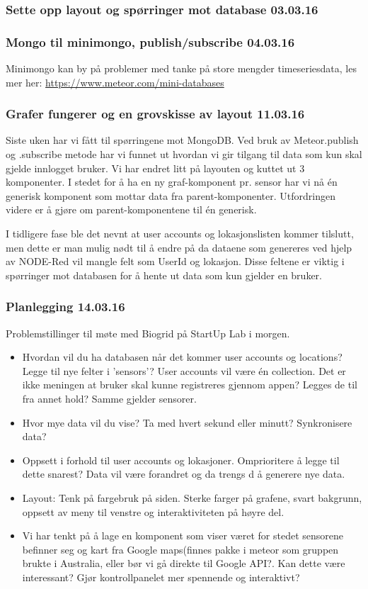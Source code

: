 \documentclass[12pt, oneside]{article}
\begin{document}
\subsubsection{Sette opp layout og spørringer mot database 03.03.16}



\subsubsection{Mongo til minimongo, publish/subscribe 04.03.16}
Minimongo kan by på problemer med tanke på store mengder timeseriesdata, les mer her: \url{https://www.meteor.com/mini-databases}


\subsubsection{Grafer fungerer og en grovskisse av layout 11.03.16}
Siste uken har vi fått til spørringene mot MongoDB. Ved bruk av Meteor.publish og .subscribe metode har vi funnet ut hvordan vi gir tilgang til data som kun skal gjelde innlogget bruker. 
Vi har endret litt på layouten og kuttet ut 3 komponenter. I stedet for å ha en ny graf-komponent pr. sensor har vi nå én generisk komponent som mottar data fra parent-komponenter. Utfordringen videre er å gjøre om parent-komponentene til én generisk.

I tidligere fase ble det nevnt at user accounts og lokasjonslisten kommer tilslutt, men dette er man mulig nødt til å endre på da dataene som genereres ved hjelp av NODE-Red vil mangle felt som UserId og lokasjon. Disse feltene er viktig i spørringer mot databasen for å hente ut data som kun gjelder en bruker. 


\subsubsection{Planlegging 14.03.16}
Problemstillinger til møte med Biogrid på StartUp Lab i morgen.
\begin{itemize}
\item Hvordan vil du ha databasen når det kommer user accounts og locations? Legge til nye felter i 'sensors'? User accounts vil være én collection. Det er ikke meningen at bruker skal kunne registreres gjennom appen? Legges de til fra annet hold? Samme gjelder sensorer.
\item Hvor mye data vil du vise? Ta med hvert sekund eller minutt? Synkronisere data?
\item Oppsett i forhold til user accounts og lokasjoner. Omprioritere å legge til dette snarest? Data vil være forandret og da trengs d å generere nye data. 
\item Layout: Tenk på fargebruk på siden. Sterke farger på grafene, svart bakgrunn, oppsett av meny til venstre og interaktiviteten på høyre del.
\item Vi har tenkt på å lage en komponent som viser været for stedet sensorene befinner seg og kart fra Google maps(finnes pakke i meteor som gruppen brukte i Australia, eller bør vi gå direkte til Google API?. Kan dette være interessant? Gjør kontrollpanelet mer spennende og interaktivt? 
\end{itemize}
\end{document}

